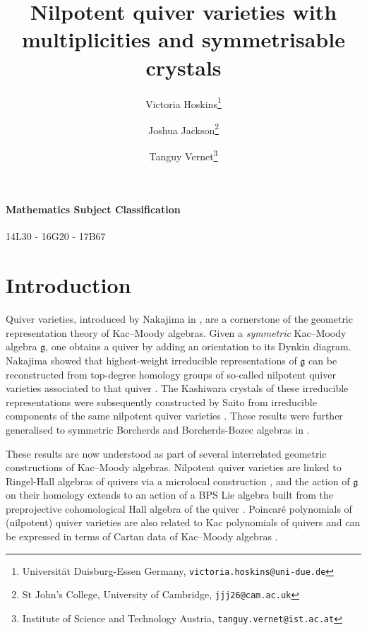 \documentclass[a4paper,12pt]{article}
\title{Nilpotent quiver varieties with multiplicities and symmetrisable crystals}
\author{Victoria Hoskins\thanks{Universit\"{a}t Duisburg-Essen Germany, \texttt{victoria.hoskins@uni-due.de}} \and Joshua Jackson\thanks{St John's College, University of Cambridge, \texttt{jjj26@cam.ac.uk}} \and Tanguy Vernet\thanks{Institute of Science and Technology Austria, \texttt{tanguy.vernet@ist.ac.at}}}
\date{}
\makeatletter
\theoremstyle{definition}
\theoremstyle{plain}
\theoremstyle{remark}
\renewcommand\tableofcontents{\@starttoc{toc}}
\makeatother
\begin{document}
\setcounter{tocdepth}{1}

\maketitle


\paragraph*{Mathematics Subject Classification}
14L30 - 16G20 - 17B67

\tableofcontents

\section{Introduction}

Quiver varieties, introduced by Nakajima in \cite{Nak94}, are a cornerstone of the geometric representation theory of Kac--Moody algebras. Given a \emph{symmetric} Kac--Moody algebra $\mathfrak{g}$, one obtains a quiver by adding an orientation to its Dynkin diagram. Nakajima showed that highest-weight irreducible representations of $\mathfrak{g}$ can be reconstructed from top-degree homology groups of so-called nilpotent quiver varieties associated to that quiver \cite{Nak98}. The Kashiwara crystals \cite{Kas91} of these irreducible representations were subsequently constructed by Saito from irreducible components of the same nilpotent quiver varieties \cite{Sai02}. These results were further generalised to symmetric Borcherds and Borcherds-Bozec algebras in \cite{KKS12,Boz16}.

These results are now understood as part of several interrelated geometric constructions of Kac--Moody algebras. Nilpotent quiver varieties are linked to Ringel-Hall algebras of quivers via a microlocal construction \cite{Rin90a,Lus91,KS97,Hen24a,FL25}, and the action of $\mathfrak{g}$ on their homology extends to an action of a BPS Lie algebra built from the preprojective cohomological Hall algebra of the quiver \cite{SV13b,YZ18a,Dav25a,DHSM23}. Poincaré polynomials of (nilpotent) quiver varieties are also related to Kac polynomials of quivers and can be expressed in terms of Cartan data of Kac--Moody algebras \cite{CBVdB04,HLRV13,Hau10,BS19,BSV20,Dav23c,DHSM23}.
\end{document}
